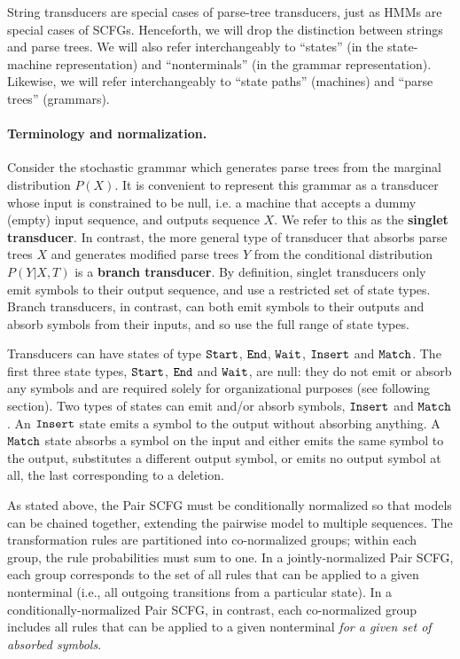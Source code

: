 \documentclass[10pt]{article}
\begin{document}
String transducers are special cases of parse-tree transducers, just
as HMMs are special cases of SCFGs.
Henceforth, we will drop the distinction between strings and parse trees.
We will also refer interchangeably to ``states'' (in the state-machine representation)
and ``nonterminals'' (in the grammar representation).
Likewise, we will refer interchangeably to ``state paths'' (machines) and ``parse trees'' (grammars).


\paragraph{Terminology and normalization.}

Consider the stochastic grammar which generates parse trees from the marginal distribution $P(X)$.
It is convenient to represent this grammar as a transducer whose input is constrained to be null,
i.e. a machine that accepts a dummy (empty) input sequence, and outputs sequence $X$.
We refer to this as the {\bf singlet transducer}.
In contrast, the more general type of transducer that absorbs parse trees $X$ and generates modified parse trees $Y$ from the conditional distribution $P(Y | X, T)$ is a {\bf branch transducer}.
By definition, singlet transducers only emit symbols to their output sequence, and use a restricted set of state types.
Branch transducers, in contrast, can both emit symbols to their outputs and absorb symbols from their inputs, and so use the full range of state types.

Transducers can have states of type $\mathtt{Start}$, $\mathtt{End}$,
$\mathtt{Wait}$, $\mathtt{Insert}$ and $\mathtt{Match}$.
The first three state types, $\mathtt{Start}$, $\mathtt{End}$ and $\mathtt{Wait}$, are null:
they do not emit or absorb any symbols and are required solely for
organizational purposes (see following section).
Two types of states can emit and/or absorb symbols, $\mathtt{Insert}$ and $\mathtt{Match}$.
An $\mathtt{Insert}$ state emits a symbol to the output without absorbing anything.
A $\mathtt{Match}$ state absorbs a symbol on the input and either emits
the same symbol to the output, substitutes a different output symbol,
or emits no output symbol at all, the last corresponding to a deletion.

As stated above, the Pair SCFG must be conditionally normalized
so that models can be chained together,
extending the pairwise model to multiple sequences.
The transformation rules are partitioned into co-normalized groups;
within each group, the rule probabilities must sum to one.
In a jointly-normalized Pair SCFG, each group corresponds to the set of all rules that can be applied to a given nonterminal
(i.e., all outgoing transitions from a particular state).
In a conditionally-normalized Pair SCFG, in contrast,
each co-normalized group includes all rules that can be applied to a
given nonterminal {\em for a given set of absorbed symbols}.
\end{document}
